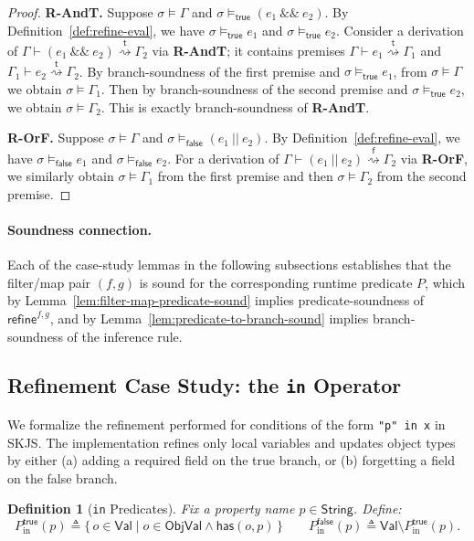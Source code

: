 \documentclass[11pt]{article}
\newtheorem{definition}[theorem]{Definition}
\newcommand{\refineop}{\mathsf{refine}}
\newcommand{\ObjVal}{\mathsf{ObjVal}}
\newcommand{\String}{\mathsf{String}}
\newcommand{\Val}{\mathsf{Val}}
\newcommand{\Env}{\Gamma}
\newcommand{\RefineT}[3]{#1 \vdash #2 \stackrel{\mathsf{t}}{\rightsquigarrow} #3}
\newcommand{\RefineF}[3]{#1 \vdash #2 \stackrel{\mathsf{f}}{\rightsquigarrow} #3}
\begin{document}
\begin{proof}
\textbf{R-AndT.}
Suppose $\sigma \models \Env$ and $\sigma \models_{\mathsf{true}} (e_1 \ \&\&\ e_2)$.
By Definition~\ref{def:refine-eval}, we have $\sigma \models_{\mathsf{true}} e_1$ and $\sigma \models_{\mathsf{true}} e_2$.
Consider a derivation of $\RefineT{\Env}{(e_1 \ \&\&\ e_2)}{\Env_2}$ via \textbf{R-AndT}; it contains premises
$\RefineT{\Env}{e_1}{\Env_1}$ and $\RefineT{\Env_1}{e_2}{\Env_2}$.
By branch-soundness of the first premise and $\sigma \models_{\mathsf{true}} e_1$, from $\sigma \models \Env$ we obtain $\sigma \models \Env_1$.
Then by branch-soundness of the second premise and $\sigma \models_{\mathsf{true}} e_2$, we obtain $\sigma \models \Env_2$.
This is exactly branch-soundness of \textbf{R-AndT}.

\textbf{R-OrF.}
Suppose $\sigma \models \Env$ and $\sigma \models_{\mathsf{false}} (e_1 \ ||\ e_2)$.
By Definition~\ref{def:refine-eval}, we have $\sigma \models_{\mathsf{false}} e_1$ and $\sigma \models_{\mathsf{false}} e_2$.
For a derivation of $\RefineF{\Env}{(e_1 \ ||\ e_2)}{\Env_2}$ via \textbf{R-OrF}, we similarly obtain $\sigma \models \Env_1$ from the first premise and then $\sigma \models \Env_2$ from the second premise.
\end{proof}

\paragraph{Soundness connection.}
Each of the case-study lemmas in the following subsections establishes that the filter/map pair $(f,g)$ is sound for the corresponding runtime predicate $P$, 
which by Lemma~\ref{lem:filter-map-predicate-sound} implies predicate-soundness of $\refineop^{f,g}$,
and by Lemma~\ref{lem:predicate-to-branch-sound} implies branch-soundness of the inference rule.

\subsection{Refinement Case Study: the \texttt{in} Operator}

We formalize the refinement performed for conditions of the form \texttt{"p" in x} in SKJS.
The implementation refines only local variables and updates object types by either (a) adding a required field on the true branch, or (b) forgetting a field on the false branch.

\begin{definition}[\texttt{in} Predicates]
\label{def:in-predicate}
Fix a property name $p \in \String$.
Define:
\[
P_{\mathrm{in}}^{\mathsf{true}}(p) \triangleq \{\, o \in \Val \mid o \in \ObjVal \land \mathsf{has}(o,p)\,\}
\qquad
P_{\mathrm{in}}^{\mathsf{false}}(p) \triangleq \Val \setminus P_{\mathrm{in}}^{\mathsf{true}}(p).
\]
\end{definition}
\end{document}
